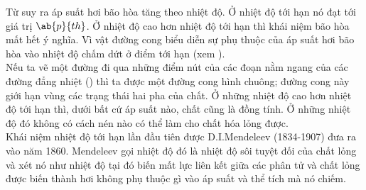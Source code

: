 Từ  suy ra áp suất hơi bão hòa tăng theo nhiệt độ. Ở nhiệt độ tới hạn nó đạt tới giá trị $\ab{p}{th}$. Ở nhiệt độ cao hơn nhiệt độ tới hạn thì khái niệm bão hòa mất hết ý nghĩa. Vì vật đường cong biểu diễn sự phụ thuộc của áp suất hơi bão hòa vào nhiệt độ chấm dứt ở điểm tới hạn (xem ).\\

Nếu ta vẽ một đường đi qua những điểm nút của các đoạn nằm ngang của các đường đẳng nhiệt () thì ta được một đường cong hình chuông; đường cong này giới hạn vùng các trạng thái hai pha của chất. Ở những nhiệt độ cao hơn nhiệt độ tới hạn thì, dưới bất cứ áp suất nào, chất cũng là đồng tính. Ở những nhiệt độ đó không có cách nén nào có thể làm cho chất hóa lỏng được.\\

Khái niệm nhiệt độ tới hạn lần đầu tiên được D.I.Mendeleev (1834-1907) đưa ra vào năm 1860. Mendeleev gọi nhiệt độ đó là nhiệt độ sôi tuyệt đối của chất lỏng và xét nó như nhiệt độ tại đó biến mất lực liên kết giữa các phân tử và chất lỏng được biến thành hơi không phụ thuộc gì vào áp suất và thể tích mà nó chiếm.\\

